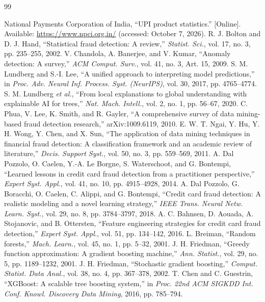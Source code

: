\documentclass[conference]{IEEEtran}
\begin{document}
\begin{thebibliography}{99}

 National Payments Corporation of India, ``UPI product statistics.'' [Online]. Available: \url{https://www.npci.org.in/} (accessed: October 7, 2026).
 R. J. Bolton and D. J. Hand, ``Statistical fraud detection: A review,'' \emph{Statist. Sci.}, vol. 17, no. 3, pp. 235--255, 2002.
 V. Chandola, A. Banerjee, and V. Kumar, ``Anomaly detection: A survey,'' \emph{ACM Comput. Surv.}, vol. 41, no. 3, Art. 15, 2009.
 S. M. Lundberg and S.-I. Lee, ``A unified approach to interpreting model predictions,'' in \emph{Proc. Adv. Neural Inf. Process. Syst. (NeurIPS)}, vol. 30, 2017, pp. 4765--4774.
 S. M. Lundberg \emph{et al.}, ``From local explanations to global understanding with explainable AI for trees,'' \emph{Nat. Mach. Intell.}, vol. 2, no. 1, pp. 56--67, 2020.
 C. Phua, V. Lee, K. Smith, and R. Gayler, ``A comprehensive survey of data mining-based fraud detection research,'' arXiv:1009.6119, 2010.
 E. W. T. Ngai, Y. Hu, Y. H. Wong, Y. Chen, and X. Sun, ``The application of data mining techniques in financial fraud detection: A classification framework and an academic review of literature,'' \emph{Decis. Support Syst.}, vol. 50, no. 3, pp. 559--569, 2011.
 A. Dal Pozzolo, O. Caelen, Y.-A. Le Borgne, S. Waterschoot, and G. Bontempi, ``Learned lessons in credit card fraud detection from a practitioner perspective,'' \emph{Expert Syst. Appl.}, vol. 41, no. 10, pp. 4915--4928, 2014.
 A. Dal Pozzolo, G. Boracchi, O. Caelen, C. Alippi, and G. Bontempi, ``Credit card fraud detection: A realistic modeling and a novel learning strategy,'' \emph{IEEE Trans. Neural Netw. Learn. Syst.}, vol. 29, no. 8, pp. 3784--3797, 2018.
 A. C. Bahnsen, D. Aouada, A. Stojanovic, and B. Ottersten, ``Feature engineering strategies for credit card fraud detection,'' \emph{Expert Syst. Appl.}, vol. 51, pp. 134--142, 2016.
 L. Breiman, ``Random forests,'' \emph{Mach. Learn.}, vol. 45, no. 1, pp. 5--32, 2001.
 J. H. Friedman, ``Greedy function approximation: A gradient boosting machine,'' \emph{Ann. Statist.}, vol. 29, no. 5, pp. 1189--1232, 2001.
 J. H. Friedman, ``Stochastic gradient boosting,'' \emph{Comput. Statist. Data Anal.}, vol. 38, no. 4, pp. 367--378, 2002.
 T. Chen and C. Guestrin, ``XGBoost: A scalable tree boosting system,'' in \emph{Proc. 22nd ACM SIGKDD Int. Conf. Knowl. Discovery Data Mining}, 2016, pp. 785--794.

\end{thebibliography}
\end{document}
